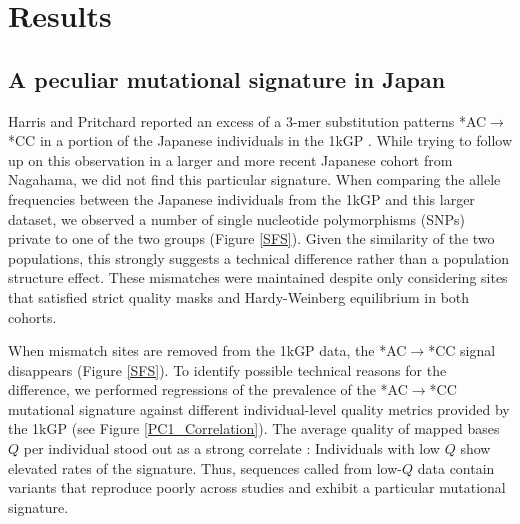 \documentclass[9pt,lineno]{template}
\begin{document}
\section{Results}

			
\subsection{A peculiar mutational signature in Japan}			
	
Harris and Pritchard reported an excess of a 3-mer substitution patterns *AC${\rightarrow}$*CC in a portion of the Japanese individuals in the 1kGP \citep{Harris2017a}.
While trying to follow up on this observation in a larger and more recent Japanese cohort from Nagahama, we did not find this particular signature.
When comparing the allele frequencies between the Japanese individuals from the 1kGP and this larger dataset, we observed a number of single nucleotide polymorphisms (SNPs) private to one of the two groups (Figure \ref{SFS}).
Given the similarity of the two populations, this strongly suggests a technical difference rather than a population structure effect.
These mismatches were maintained despite only considering sites that satisfied strict quality masks and Hardy-Weinberg equilibrium in both cohorts.


When mismatch sites are removed from the 1kGP data, the  *AC${\rightarrow}$*CC signal disappears (Figure \ref{SFS}). To identify possible technical reasons for the difference, we performed regressions of the prevalence of the  *AC${\rightarrow}$*CC mutational signature against different individual-level quality metrics provided by the 1kGP (see Figure \ref{PC1_Correlation}). 
The average quality of mapped bases  $Q$ per individual stood out as a strong correlate : Individuals with low $Q$ show elevated rates of the signature. 
Thus, sequences called from low-$Q$ data contain variants that reproduce poorly across studies and exhibit a particular mutational signature. 
\end{document}
